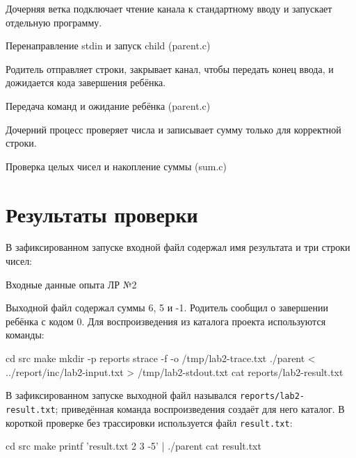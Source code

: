 \documentclass[12pt,a4paper]{article}
\begin{document}
Дочерняя ветка подключает чтение канала к стандартному вводу и запускает отдельную программу.
\begin{listingblock}{Перенаправление stdin и запуск child (parent.c)}
\end{listingblock}

\clearpage
Родитель отправляет строки, закрывает канал, чтобы передать конец ввода, и дожидается кода завершения ребёнка.
\begin{listingblock}{Передача команд и ожидание ребёнка (parent.c)}
\end{listingblock}

Дочерний процесс проверяет числа и записывает сумму только для корректной строки.
\clearpage
\begin{listingblock}{Проверка целых чисел и накопление суммы (sum.c)}
\end{listingblock}

\section{Результаты проверки}

В зафиксированном запуске входной файл содержал имя результата и три строки чисел:

\begin{listingblock}{Входные данные опыта ЛР №2}
\end{listingblock}

Выходной файл содержал суммы 6, 5 и -1. Родитель сообщил о завершении ребёнка с кодом 0. Для воспроизведения из каталога проекта используются команды:

\begin{terminal}
cd src
make
mkdir -p reports
strace -f -o /tmp/lab2-trace.txt ./parent < ../report/inc/lab2-input.txt > /tmp/lab2-stdout.txt
cat reports/lab2-result.txt
\end{terminal}

В зафиксированном запуске выходной файл назывался \texttt{reports/lab2-result.txt}; приведённая команда воспроизведения создаёт для него каталог. В короткой проверке без трассировки используется файл \texttt{result.txt}:

\begin{terminal}
cd src
make
printf 'result.txt 2 3 -5\n\n' | ./parent
cat result.txt
\end{terminal}
\end{document}
